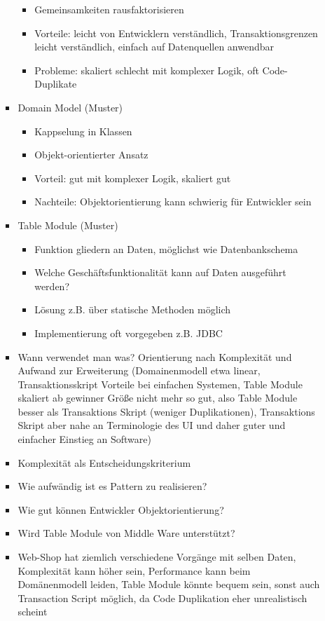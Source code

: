 \documentclass[paper=a4, fontsize=11pt]{scrartcl} %
\numberwithin{equation}{section} %
\numberwithin{figure}{section} %
\numberwithin{table}{section} %
\begin{document}
\begin{itemize}
\begin{itemize}
\begin{itemize}
\begin{itemize}
        \item Gemeinsamkeiten rausfaktorisieren
        \item Vorteile: leicht von Entwicklern verständlich, Transaktionsgrenzen leicht verständlich, einfach auf Datenquellen anwendbar
        \item Probleme: skaliert schlecht mit komplexer Logik, oft Code-Duplikate
      \end{itemize}
      \item Domain Model (Muster)
      \begin{itemize}
        \item Kappselung in Klassen
        \item Objekt-orientierter Ansatz
        \item Vorteil: gut mit komplexer Logik, skaliert gut
        \item Nachteile: Objektorientierung kann schwierig für Entwickler sein
      \end{itemize}
      \item Table Module (Muster)
      \begin{itemize}
        \item Funktion gliedern an Daten, möglichst wie Datenbankschema
        \item Welche Geschäftsfunktionalität kann auf Daten ausgeführt werden?
        \item Lösung z.B. über statische Methoden möglich
        \item Implementierung oft vorgegeben z.B. JDBC
      \end{itemize}
      \item Wann verwendet man was? Orientierung nach Komplexität und Aufwand zur Erweiterung (Domainenmodell etwa linear, Transaktionsskript Vorteile bei einfachen Systemen, Table Module skaliert ab gewinner Größe nicht mehr so gut, also Table Module besser als Transaktions Skript (weniger Duplikationen), Transaktions Skript aber nahe an Terminologie des UI und daher guter und einfacher Einstieg an Software)
      \item Komplexität als Entscheidungskriterium
      \item Wie aufwändig ist es Pattern zu realisieren?
      \item Wie gut können Entwickler Objektorientierung?
      \item Wird Table Module von Middle Ware unterstützt?
      \item Web-Shop hat ziemlich verschiedene Vorgänge mit selben Daten, Komplexität kann höher sein, Performance kann beim Domänenmodell leiden, Table Module könnte bequem sein, sonst auch Transaction Script möglich, da Code Duplikation eher unrealistisch scheint

\end{itemize}
\end{itemize}
\end{itemize}
\end{document}
